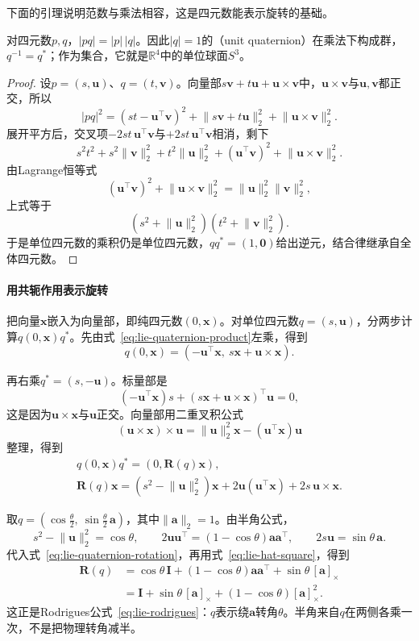 下面的引理说明范数与乘法相容，这是四元数能表示旋转的基础。

\begin{lemma}[范数的乘法性]
\label{lem:lie-quaternion-norm}
对四元数$p,q$，$\lvert pq\rvert=\lvert p\rvert\,\lvert q\rvert$。因此$\lvert q\rvert=1$的（unit quaternion）在乘法下构成群，$q^{-1}=q^*$；作为集合，它就是$\mathbb R^4$中的单位球面$S^3$。
\end{lemma}

\begin{proof}
设$p=(s,\bm u)$、$q=(t,\bm v)$。向量部$s\bm v+t\bm u+\bm u\times\bm v$中，$\bm u\times\bm v$与$\bm u,\bm v$都正交，所以
\[
\lvert pq\rvert^2=(st-\bm u^\top\bm v)^2+\lVert s\bm v+t\bm u\rVert_2^2+\lVert\bm u\times\bm v\rVert_2^2.
\]
展开平方后，交叉项$-2st\,\bm u^\top\bm v$与$+2st\,\bm u^\top\bm v$相消，剩下
\[
s^2t^2+s^2\lVert\bm v\rVert_2^2+t^2\lVert\bm u\rVert_2^2+(\bm u^\top\bm v)^2+\lVert\bm u\times\bm v\rVert_2^2.
\]
由Lagrange恒等式
\[
(\bm u^\top\bm v)^2+\lVert\bm u\times\bm v\rVert_2^2=\lVert\bm u\rVert_2^2\lVert\bm v\rVert_2^2,
\]
上式等于
\[
(s^2+\lVert\bm u\rVert_2^2)(t^2+\lVert\bm v\rVert_2^2).
\]
于是单位四元数的乘积仍是单位四元数，$qq^*=(1,\bm0)$给出逆元，结合律继承自全体四元数。
\end{proof}

\paragraph{用共轭作用表示旋转}
把向量$\bm x$嵌入为向量部，即纯四元数$(0,\bm x)$。对单位四元数$q=(s,\bm u)$，分两步计算$q(0,\bm x)q^*$。先由式~\eqref{eq:lie-quaternion-product}左乘，得到
\[
q(0,\bm x)=(-\bm u^\top\bm x,\ s\bm x+\bm u\times\bm x).
\]

再右乘$q^*=(s,-\bm u)$。标量部是
\[
(-\bm u^\top\bm x)s+(s\bm x+\bm u\times\bm x)^\top\bm u=0,
\]
这是因为$\bm u\times\bm x$与$\bm u$正交。向量部用二重叉积公式
\[
(\bm u\times\bm x)\times\bm u=\lVert\bm u\rVert_2^2\bm x-(\bm u^\top\bm x)\bm u
\]
整理，得到
\begin{equation}
 \begin{gathered}
 q(0,\bm x)q^*=(0,\bm R(q)\bm x),\\
 \bm R(q)\bm x=(s^2-\lVert\bm u\rVert_2^2)\bm x+2\bm u(\bm u^\top\bm x)+2s\,\bm u\times\bm x.
 \end{gathered}
 \label{eq:lie-quaternion-rotation}
\end{equation}

取$q=(\cos\frac\theta2,\ \sin\frac\theta2\,\bm a)$，其中$\lVert\bm a\rVert_2=1$。由半角公式，
\[
s^2-\lVert\bm u\rVert_2^2=\cos\theta,\qquad
2\bm u\bm u^\top=(1-\cos\theta)\bm a\bm a^\top,\qquad
2s\bm u=\sin\theta\,\bm a.
\]
代入式~\eqref{eq:lie-quaternion-rotation}，再用式~\eqref{eq:lie-hat-square}，得到
\[
\begin{aligned}
\bm R(q)
&=\cos\theta\,\bm I+(1-\cos\theta)\bm a\bm a^\top+\sin\theta\,[\bm a]_\times\\
&=\bm I+\sin\theta\,[\bm a]_\times+(1-\cos\theta)[\bm a]_\times^2 .
\end{aligned}
\]
这正是Rodrigues公式~\eqref{eq:lie-rodrigues}：$q$表示绕$\bm a$转角$\theta$。半角来自$q$在两侧各乘一次，不是把物理转角减半。

